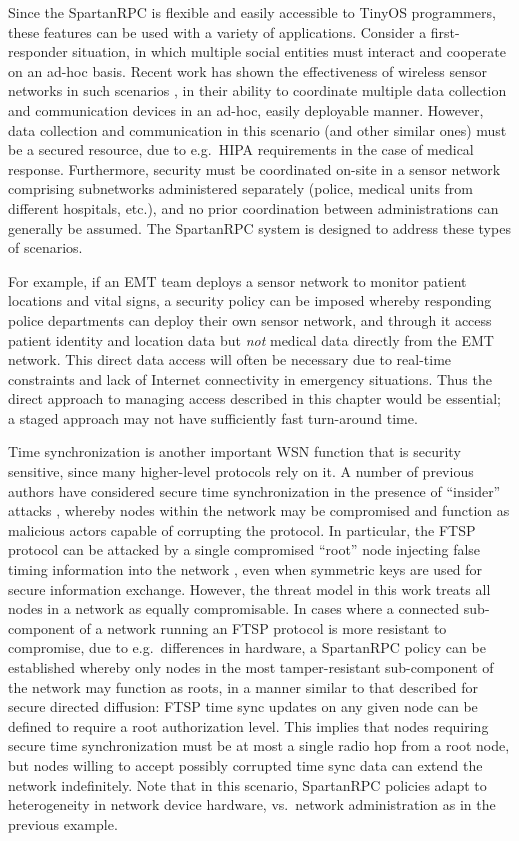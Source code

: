 Since the SpartanRPC is flexible and easily accessible to TinyOS programmers, these features can
be used with a variety of applications. Consider a first-responder situation, in which multiple
social entities must interact and cooperate on an ad-hoc basis. Recent work has shown the
effectiveness of wireless sensor networks in such scenarios \cite{citeulike:4460555,1038146}, in
their ability to coordinate multiple data collection and communication devices in an ad-hoc,
easily deployable manner. However, data collection and communication in this scenario (and other
similar ones) must be a secured resource, due to e.g.~HIPA requirements in the case of medical
response. Furthermore, security must be coordinated on-site in a sensor network comprising
subnetworks administered separately (police, medical units from different hospitals, etc.), and
no prior coordination between administrations can generally be assumed. The SpartanRPC system is
designed to address these types of scenarios.

For example, if an EMT team deploys a sensor network to monitor patient locations and vital
signs, a security policy can be imposed whereby responding police departments can deploy their
own sensor network, and through it access patient identity and location data but \emph{not}
medical data directly from the EMT network. This direct data access will often be necessary due
to real-time constraints and lack of Internet connectivity in emergency situations. Thus the
direct approach to managing access described in this chapter would be essential; a staged
approach may not have sufficiently fast turn-around time.

Time synchronization is another important WSN function that is security sensitive, since many
higher-level protocols rely on it. A number of previous authors have considered secure time
synchronization in the presence of ``insider'' attacks
\cite{Manzo:2005:TSA:1102219.1102238,Ganeriwal:2008:STS:1380564.1380571}, whereby nodes within
the network may be compromised and function as malicious actors capable of corrupting the
protocol. In particular, the FTSP protocol can be attacked by a single compromised ``root'' node
injecting false timing information into the network \cite{Manzo:2005:TSA:1102219.1102238}, even
when symmetric keys are used for secure information exchange. However, the threat model in this
work treats all nodes in a network as equally compromisable. In cases where a connected
sub-component of a network running an FTSP protocol is more resistant to compromise, due to
e.g.~differences in hardware, a SpartanRPC policy can be established whereby only nodes in the
most tamper-resistant sub-component of the network may function as roots, in a manner similar to
that described for secure directed diffusion: FTSP time sync updates on any given node can be
defined to require a root authorization level. This implies that nodes requiring secure time
synchronization must be at most a single radio hop from a root node, but nodes willing to accept
possibly corrupted time sync data can extend the network indefinitely. Note that in this
scenario, SpartanRPC policies adapt to heterogeneity in network device hardware, vs.~network
administration as in the previous example.

